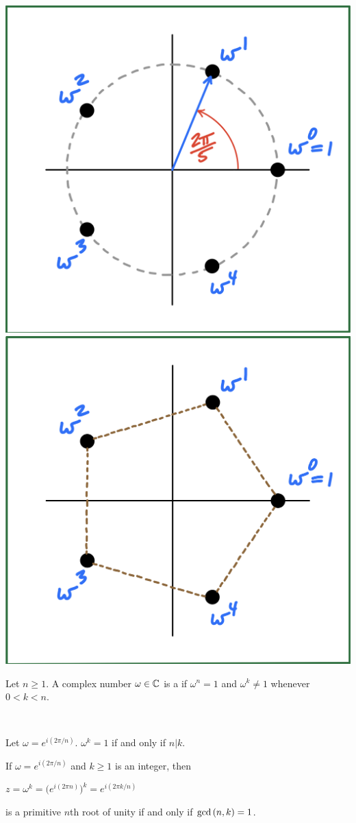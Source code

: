 \documentclass[11pt,fleqn,dvipsnames,usenames]{article}
\begin{document}
\begin{center}
\includegraphics[width=0.3\linewidth]{fifthrootsunity}\hspace{4cm} \includegraphics[width=0.3\linewidth]{fifthrootsunityhexagon}
\end{center}
%
\begin{definition*} Let $n\geq 1$.  A complex number $\omega\in\mathbb{C}$ is a  if $\omega^{n} = 1$ and $\omega^{k}\neq 1$ whenever $0 < k < n$.
\end{definition*}
%
\begin{examples*}~
\end{examples*}
\vspace{7cm}

\begin{lemma*}
Let $\omega = e^{i(2\pi/n)}$.  $\omega^{k} = 1$ if and only if $n|k$.
\end{lemma*}
%
\prf
\newpage
%

\begin{theorem*}
If $\omega = e^{i(2\pi/n)}$ and $k\geq 1$ is an integer, then
\begin{center}
$z = \omega^{k} = \big(e^{i(2\pi n)}\big)^{k} = e^{i(2\pi k/n)}$
\end{center}
is a primitive $n$th root of unity if and only if $\text{gcd}\left(n,k\right) = 1$.
\end{theorem*}
%
\prf
\vspace{7cm}
\end{document}
